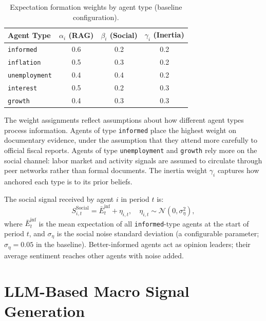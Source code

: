 \begin{table}[htbp]
    \centering
    \caption{Expectation formation weights by agent type (baseline configuration).}
    \label{tab:expectation_weights}
    \begin{tabular}{lccc}
        \hline
        \textbf{Agent Type} & $\alpha_i$ (RAG) & $\beta_i$ (Social) & $\gamma_i$ (Inertia) \\
        \hline
        \texttt{informed}    & 0.6 & 0.2 & 0.2 \\
        \texttt{inflation}   & 0.5 & 0.3 & 0.2 \\
        \texttt{unemployment}& 0.4 & 0.4 & 0.2 \\
        \texttt{interest}    & 0.5 & 0.2 & 0.3 \\
        \texttt{growth}      & 0.4 & 0.3 & 0.3 \\
        \hline
    \end{tabular}
\end{table}

The weight assignments reflect assumptions about how different agent types process information. Agents of type \texttt{informed} place the highest weight on documentary evidence, under the assumption that they attend more carefully to official fiscal reports. Agents of type \texttt{unemployment} and \texttt{growth} rely more on the social channel: labor market and activity signals are assumed to circulate through peer networks rather than formal documents. The inertia weight $\gamma_i$ captures how anchored each type is to its prior beliefs.

The social signal received by agent $i$ in period $t$ is:
\begin{equation}
    S^{\text{Social}}_{i,t} = \bar{E}^{\text{inf}}_t + \eta_{i,t}, \quad \eta_{i,t} \sim \mathcal{N}(0, \sigma_\eta^2),
    \label{eq:social_signal}
\end{equation}
where $\bar{E}^{\text{inf}}_t$ is the mean expectation of all \texttt{informed}-type agents at the start of period $t$, and $\sigma_\eta$ is the social noise standard deviation (a configurable parameter; $\sigma_\eta = 0.05$ in the baseline). Better-informed agents act as opinion leaders; their average sentiment reaches other agents with noise added.

\section{LLM-Based Macro Signal Generation}
\label{sec:llm_signal}

